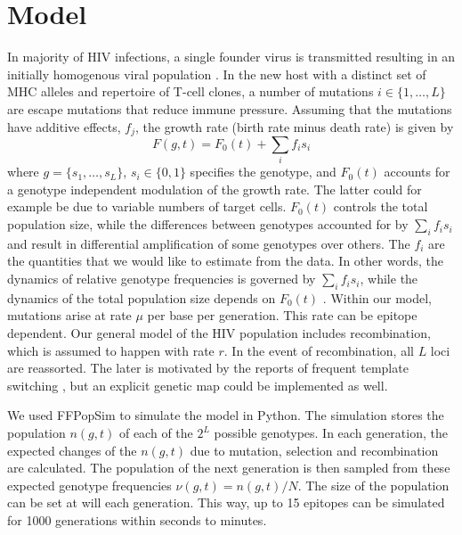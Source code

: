 \documentclass[rmp,twocolumn]{revtex4}
\newcommand{\gt}{g}
\newcommand{\fcoeff}{f}
\newcommand{\locus}{s}
\begin{document}
\section*{Model} In majority of HIV infections, a single founder virus is
transmitted resulting in an initially homogenous viral population
\citep{SalazarGonzalez:2009p35091}.
In the new host with a distinct set of MHC alleles and repertoire of T-cell
clones, a number of mutations $i\in \{1,\ldots,L\}$ are escape mutations that
reduce immune pressure. Assuming that the mutations have additive effects,
$\fcoeff_j$, the growth rate (birth rate minus death rate) is given by
\begin{equation}
F(\gt,t) = F_0(t) + \sum_i \fcoeff_i \locus_i
\end{equation}
where $\gt = \{\locus_1, \ldots, \locus_L\}$, $\locus_i \in \{0,1\}$ specifies
the genotype, and $F_0(t)$ accounts for a genotype independent modulation of
the growth rate. The latter could for example be due to variable numbers of
target cells. $F_0(t)$ controls the total population size, while the differences
between genotypes accounted for by $\sum_i \fcoeff_i \locus_i$ and result in
differential amplification of some genotypes over others. The
$\fcoeff_i$ are the quantities that we would like to estimate from the data. In
other words, the dynamics of relative genotype frequencies is governed by $\sum_i \fcoeff_i \locus_i$, 
while the dynamics of the total population size depends on $F_0(t)$
\citep{ganusov_mathematical_2013}. Within our model, mutations arise at rate
$\mu$ per base per generation. This rate can be epitope dependent. Our general
model of the HIV population includes recombination, which is assumed to happen
with rate $r$. In the event of recombination, all $L$ loci are reassorted. The
later is motivated by the reports of frequent template switching
\citep{Levy:2004p23309}, but an explicit genetic map could be implemented as
well.

We used FFPopSim \citep{zanini_ffpopsim:_2012} to simulate the model in
Python. The simulation stores the population $n(\gt,t)$ of each of the $2^L$
possible genotypes. In each generation, the expected changes of the $n(\gt,t)$
due to mutation, selection and recombination are calculated. The population of
the next generation is then sampled from these expected genotype frequencies
$\nu(\gt,t) = n(\gt,t)/N$.
The size of the population can be set at will each generation. This way, up to
15 epitopes can be simulated for 1000 generations within seconds to minutes. 
\end{document}
